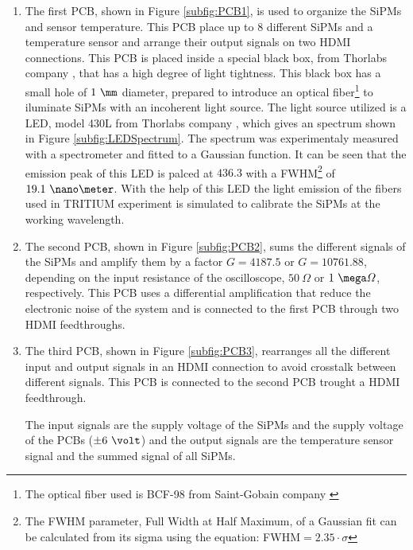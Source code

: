 \begin{enumerate}
\item{} The first PCB, shown in Figure \ref{subfig:PCB1}, is used to organize the SiPMs and sensor temperature. This PCB place up to 8 different SiPMs and a temperature sensor and arrange their output signals on two HDMI connections. This PCB is placed inside a special black box, from Thorlabs company \cite{ThorlabsCompany}, that has a high degree of light tightness. This black box has a small hole of $1~\mm$ diameter, prepared to introduce an optical fiber\footnote{The optical fiber used is BCF-98 from Saint-Gobain company \cite{OpticalFibers}} to iluminate SiPMs with an incoherent light source. The light source utilized is a LED, model 430L from Thorlabs company \cite{LEDThorlabs}, which gives an spectrum shown in Figure \ref{subfig:LEDSpectrum}. The spectrum was experimentaly measured with a spectrometer and fitted to a Gaussian function. It can be seen that the emission peak of this LED is palced at $436.3$ with a FWHM\footnote{The FWHM parameter, Full Width at Half Maximum, of a Gaussian fit can be calculated from its sigma using the equation: FWHM$=2.35 \cdot{} \sigma$} of $19.1~\nano\meter$. With the help of this LED the light emission of the fibers used in TRITIUM experiment is simulated to calibrate the SiPMs at the working wavelength. 

\item{} The second PCB, shown in Figure \ref{subfig:PCB2}, sums the different signals of the SiPMs and amplify them by a factor $G=4187.5$ or $G=10761.88$, depending on the input resistance of the oscilloscope, $50~\varOmega$ or $1~\mega\varOmega$, respectively. This PCB uses a differential amplification that reduce the electronic noise of the system and is connected to the first PCB through two HDMI feedthroughs.

\item{} The third PCB, shown in Figure \ref{subfig:PCB3}, rearranges all the different input and output signals in an HDMI connection to avoid crosstalk between different signals. This PCB is connected to the second PCB trought a HDMI feedthrough.

The input signals are the supply voltage of the SiPMs and the supply voltage of the PCBs ($\pm 6~\volt$) and the output signals are the temperature sensor signal and the summed signal of all SiPMs. 

\end{enumerate}

